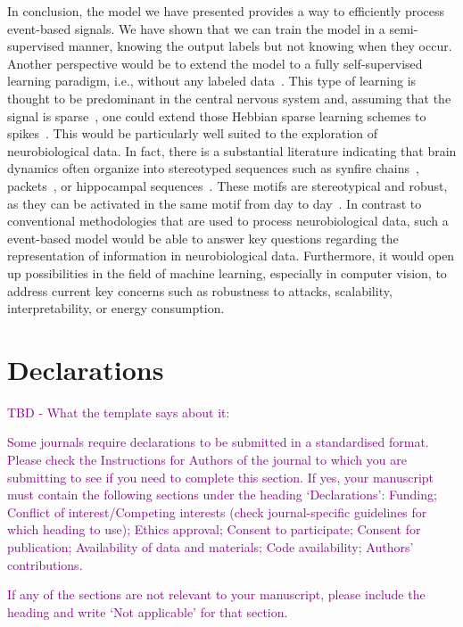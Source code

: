 \documentclass[default]{sn-jnl}%
\theoremstyle{thmstyleone}%
\theoremstyle{thmstyletwo}%
\theoremstyle{thmstylethree}%
\begin{document}
In conclusion, the model we have presented provides a way to efficiently process event-based signals. We have shown that we can train the model in a semi-supervised manner, knowing the output labels but not knowing when they occur. Another perspective would be to extend the model to a fully self-supervised learning paradigm, i.e., without any labeled data~\citep{barlow_unsupervised_1989}. This type of learning is thought to be predominant in the central nervous system and, assuming that the signal is sparse~\citep{olshausen_emergence_1996}, one could extend those Hebbian sparse learning schemes to spikes~\citep{perrinet_emergence_2004, masquelier_competitive_2009}. This would be particularly well suited to the exploration of neurobiological data. In fact, there is a substantial literature indicating that brain dynamics often organize into stereotyped sequences such as synfire chains~\citep{ikegaya_synfire_2004}, packets~\citep{luczak_sequential_2007}, or hippocampal sequences~\citep{pastalkova_internally_2008, villette_internally_2015}. These motifs are stereotypical and robust, as they can be activated in the same motif from day to day~\citep{haimerl_internal_2019}. In contrast to conventional methodologies that are used to process neurobiological data, such a event-based model would be able to answer key questions regarding the representation of information in neurobiological data. Furthermore, it would open up possibilities in the field of machine learning, especially in computer vision, to address current key concerns such as robustness to attacks, scalability, interpretability, or energy consumption.
%
\backmatter
%
%
\Acknowledgments
%
\section*{Declarations}

\textcolor{purple}{TBD - What the template says about it:}

\textcolor{purple}{Some journals require declarations to be submitted in a standardised format. Please check the Instructions for Authors of the journal to which you are submitting to see if you need to complete this section. If yes, your manuscript must contain the following sections under the heading `Declarations': Funding; Conflict of interest/Competing interests (check journal-specific guidelines for which heading to use); Ethics approval; Consent to participate; Consent for publication; Availability of data and materials; Code availability; Authors' contributions. }

\textcolor{purple}{If any of the sections are not relevant to your manuscript, please include the heading and write `Not applicable' for that section. }




\end{document}
